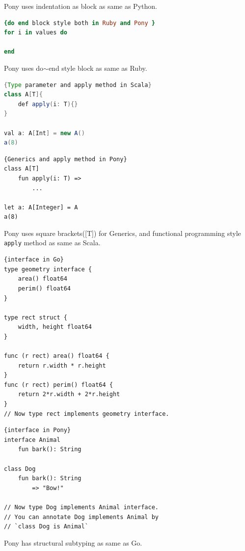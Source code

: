 \documentclass{article}
\begin{document}
\begin{multicols}{2}
Pony uses indentation as block as same as Python.\\

\begin{lstlisting}[language=Ruby]{do end block style both in Ruby and Pony }
for i in values do
	
end		
\end{lstlisting}

 Pony uses do$\sim$end style block as same as Ruby. \\


\begin{lstlisting}[language=Java]{Type parameter and apply method in Scala}
class A[T]{
	def apply(i: T){}
}	

val a: A[Int] = new A()
a(8)
\end{lstlisting}

\begin{lstlisting}{Generics and apply method in Pony}
class A[T]
	fun apply(i: T) =>
		...
	
let a: A[Integer] = A
a(8)	
\end{lstlisting}

Pony uses square brackets([T]) for Generics, and functional programming style \texttt{apply} method as same as Scala. \\


\begin{lstlisting}{interface in Go}
type geometry interface {
    area() float64
    perim() float64
}

type rect struct {
    width, height float64
}

func (r rect) area() float64 {
    return r.width * r.height
}
func (r rect) perim() float64 {
    return 2*r.width + 2*r.height
}
// Now type rect implements geometry interface.

\end{lstlisting}

\begin{lstlisting}{interface in Pony}
interface Animal
	fun bark(): String
	
class Dog
	fun bark(): String
		=> "Bow!"	
	
// Now type Dog implements Animal interface.
// You can annotate Dog implements Animal by 
// `class Dog is Animal`
\end{lstlisting}
 
Pony has structural subtyping as same as Go. \\



\end{multicols}
\end{document}
